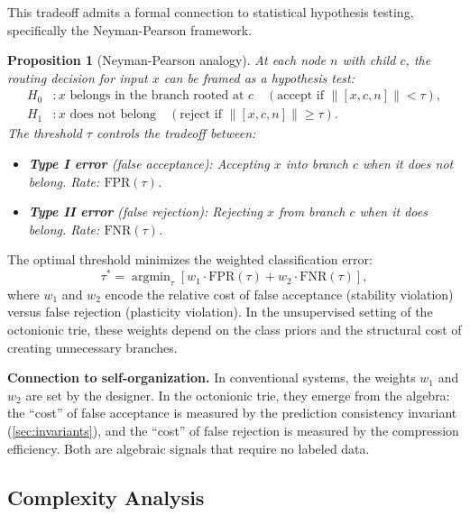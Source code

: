 \documentclass[11pt,a4paper]{article}
\newtheorem{proposition}[theorem]{Proposition}
\theoremstyle{definition}
\theoremstyle{remark}
\DeclareMathOperator{\argmin}{argmin}
\begin{document}
This tradeoff admits a formal connection to statistical hypothesis testing, specifically the Neyman-Pearson framework.

\begin{proposition}[Neyman-Pearson analogy]
\label{prop:neyman-pearson}
At each node $n$ with child $c$, the routing decision for input $x$ can be framed as a hypothesis test:
\begin{align}
  H_0 &: x \text{ belongs in the branch rooted at } c \quad (\text{accept if } \lVert [x, c, n] \rVert < \tau), \\
  H_1 &: x \text{ does not belong} \quad (\text{reject if } \lVert [x, c, n] \rVert \geq \tau).
\end{align}
The threshold $\tau$ controls the tradeoff between:
\begin{itemize}[nosep]
  \item \textbf{Type I error} (false acceptance): Accepting $x$ into branch $c$ when it does not belong. Rate: $\text{FPR}(\tau)$.
  \item \textbf{Type II error} (false rejection): Rejecting $x$ from branch $c$ when it does belong. Rate: $\text{FNR}(\tau)$.
\end{itemize}
\end{proposition}

The optimal threshold minimizes the weighted classification error:
\begin{equation}
  \tau^* = \argmin_\tau \left[ w_1 \cdot \text{FPR}(\tau) + w_2 \cdot \text{FNR}(\tau) \right],
  \label{eq:optimal-tau}
\end{equation}
where $w_1$ and $w_2$ encode the relative cost of false acceptance (stability violation) versus false rejection (plasticity violation). In the unsupervised setting of the octonionic trie, these weights depend on the class priors and the structural cost of creating unnecessary branches.

\textbf{Connection to self-organization.} In conventional systems, the weights $w_1$ and $w_2$ are set by the designer. In the octonionic trie, they emerge from the algebra: the ``cost'' of false acceptance is measured by the prediction consistency invariant (\cref{sec:invariants}), and the ``cost'' of false rejection is measured by the compression efficiency. Both are algebraic signals that require no labeled data.

\subsection{Complexity Analysis}
\label{sec:complexity}
\end{document}
